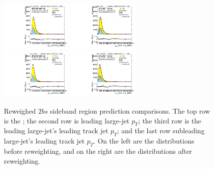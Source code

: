 \begin{figure}[htbp!]
\begin{center}
\includegraphics[width=0.31\textwidth,angle=-90]{figures/boosted/Prereweight/Moriond_TwoTag_split_Sideband_leadHCand_trk0_Pt.pdf}
\includegraphics[width=0.31\textwidth,angle=-90]{figures/boosted/Sideband/b77_TwoTag_split_Sideband_leadHCand_trk0_Pt.pdf}\\
\includegraphics[width=0.31\textwidth,angle=-90]{figures/boosted/Prereweight/Moriond_TwoTag_split_Sideband_sublHCand_trk0_Pt.pdf}
\includegraphics[width=0.31\textwidth,angle=-90]{figures/boosted/Sideband/b77_TwoTag_split_Sideband_sublHCand_trk0_Pt.pdf}\\
\caption{Reweighed $2bs$ sideband region prediction comparisons. The top row is the \mtwoJ; the second row is leading large-\R jet $p_{T}$; the third row is the leading large-\R jet's leading track jet $p_T$; and the last row subleading large-\R jet's leading track jet $p_T$. On the left are the distributions before reweighting, and on the right are the distributions after reweighting.}
\label{fig:rw-2bs-comp-sb}
\end{center}
\end{figure}


